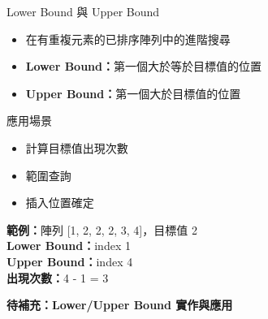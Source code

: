 \documentclass{beamer}
\begin{document}
\begin{frame}{Lower Bound 與 Upper Bound}
\begin{itemize}
    \item 在有重複元素的已排序陣列中的進階搜尋
    \item \textbf{Lower Bound：}第一個大於等於目標值的位置
    \item \textbf{Upper Bound：}第一個大於目標值的位置
\end{itemize}

\vspace{1em}
\begin{block}{應用場景}
\begin{itemize}
    \item 計算目標值出現次數
    \item 範圍查詢
    \item 插入位置確定
\end{itemize}
\end{block}

\vspace{1em}
\textbf{範例：}陣列 [1, 2, 2, 2, 3, 4]，目標值 2\\
\textbf{Lower Bound：}index 1\\
\textbf{Upper Bound：}index 4\\
\textbf{出現次數：}4 - 1 = 3

\vspace{1em}
\textbf{待補充：Lower/Upper Bound 實作與應用}
\end{frame}
\end{document}
